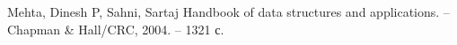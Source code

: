 \begin{thebibliography}{99}
    Mehta, Dinesh P, Sahni, Sartaj Handbook of data structures and applications. -- Chapman \& Hall/CRC, 2004. -- 1321 с.
\end{thebibliography}
\pagebreak
